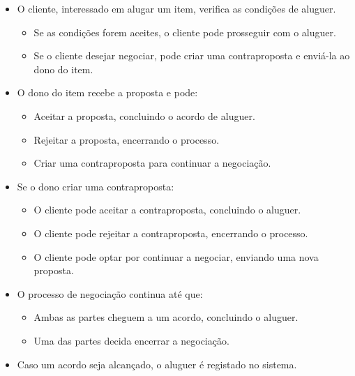 \documentclass[a4paper, 12pt]{article} %
\begin{document}
\begin{itemize}
	\item O cliente, interessado em alugar um item, verifica as condições de aluguer.
	\begin{itemize}
		\item Se as condições forem aceites, o cliente pode prosseguir com o aluguer.
		\item Se o cliente desejar negociar, pode criar uma contraproposta e enviá-la ao dono do item.
	\end{itemize}
	\item O dono do item recebe a proposta e pode:
	\begin{itemize}
		\item Aceitar a proposta, concluindo o acordo de aluguer.
		\item Rejeitar a proposta, encerrando o processo.
		\item Criar uma contraproposta para continuar a negociação.
	\end{itemize}
	\item Se o dono criar uma contraproposta:
	\begin{itemize}
		\item O cliente pode aceitar a contraproposta, concluindo o aluguer.
		\item O cliente pode rejeitar a contraproposta, encerrando o processo.
		\item O cliente pode optar por continuar a negociar, enviando uma nova proposta.
	\end{itemize}
	\item O processo de negociação continua até que:
	\begin{itemize}
		\item Ambas as partes cheguem a um acordo, concluindo o aluguer.
		\item Uma das partes decida encerrar a negociação.
	\end{itemize}
	\item Caso um acordo seja alcançado, o aluguer é registado no sistema.
\end{itemize}
\end{document}
